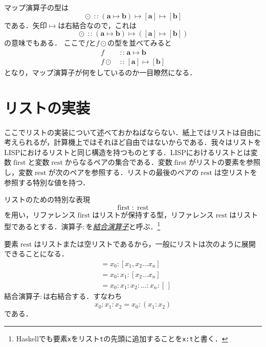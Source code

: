 \documentclass[a5paper,draft]{jsbook}
\newcommand{\programminglanguage}[1]{\textsf{#1}}
\newcommand{\haskell}{\programminglanguage{Haskell}}
\newcommand{\lisp}{\programminglanguage{LISP}}
\newcommand{\keyword}[1]{{\underline{\emph{#1}}}}
\newcommand{\code}[1]{\texttt{#1}}
\newcommand{\mathTypeParameter}[1]{\mathbf{#1}}
\newcommand{\mathListType}[1]{\left[#1\right]}
\newcommand{\mathEmptyList}{{[\,]}}%
\newcommand{\mathBinaryOperator}[1]{\operatorname{#1}}
\newcommand{\mathIn}{\mathBinaryOperator{:\!:}}
\newcommand{\mathMap}{\mathBinaryOperator{\odot}}
\newcommand{\mathMapsTo}{\mapsto}
\newcommand{\mathVarKeyword}[1]{\operatorname{\mathrm{#1}}}
\newcommand{\mathFirst}{\mathVarKeyword{first}}
\newcommand{\mathRest}{\mathVarKeyword{rest}}
\newcommand{\mathMorph}[2]{#1\mathMapsTo#2}
\newcommand{\mathMorphII}[3]{#1\mathMapsTo#2\mathMapsTo#3}
\begin{document}
マップ演算子の型は
\begin{equation}
\mathMap\mathIn{}\mathMorphII{(\mathMorph{\mathTypeParameter{a}}{\mathTypeParameter{b}})}{\mathListType{\mathTypeParameter{a}}}{\mathListType{\mathTypeParameter{b}}}
\end{equation}
である．矢印$\mathMapsTo$は右結合なので，これは
\begin{equation}
\mathMap\mathIn\mathMorph{(\mathMorph{\mathTypeParameter{a}}{\mathTypeParameter{b}})}{\left(\mathMorph{\mathListType{\mathTypeParameter{a}}}{\mathListType{\mathTypeParameter{b}}}\right)}
\end{equation}
の意味でもある．
ここで$f$と$f\mathMap$の型を並べてみると
\begin{align}
f&\mathIn\mathMorph{\mathTypeParameter{a}}{\mathTypeParameter{b}}\\
f\mathMap&\mathIn\mathMorph{\mathListType{\mathTypeParameter{a}}}{\mathListType{\mathTypeParameter{b}}}
\end{align}
となり，マップ演算子が何をしているのか一目瞭然になる．

\section{リストの実装}

ここでリストの実装について述べておかねばならない．紙上ではリストは自由に考えられるが，計算機上ではそれほど自由ではないからである．我々はリストを\lisp におけるリストと同じ構造を持つものとする．\lisp におけるリストとは変数$\mathFirst$と変数$\mathRest$からなるペアの集合である．変数$\mathFirst$がリストの要素を参照し，変数$\mathRest$が次のペアを参照する．リストの最後のペアの$\mathRest$は空リストを参照する特別な値を持つ．

リストのための特別な表現
\begin{equation}
\mathFirst:\mathRest
\end{equation}
を用い，リファレンス$\mathFirst$はリストが保持する型，リファレンス$\mathRest$はリスト型であるとする．演算子$:$を\keyword{結合演算子}と呼ぶ．\footnote{\haskell でも要素\code{x}をリスト\code{t}の先頭に追加することを\code{x:t}と書く．}

要素$\mathRest$はリストまたは空リストであるから，一般にリストは次のように展開できることになる．
\begin{align*}
[x_0,x_1,x_2\dots x_n]&=x_0:[x_1,x_2\dots x_n]\\
&=x_0:x_1:[x_2\dots x_n]\\
&=x_0:x_1:x_2:\dots:x_n:\mathEmptyList
\end{align*}
結合演算子$:$は右結合する．すなわち$$x_0:x_1:x_2=x_0:(x_1:x_2)$$である．
\end{document}

